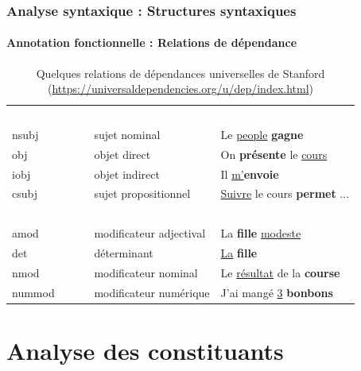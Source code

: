 \documentclass[xcolor=table]{beamer}
\begin{document}
\begin{frame}
\frametitle{Analyse syntaxique : Structures syntaxiques}
\framesubtitle{Annotation fonctionnelle : Relations de dépendance}

\begin{table}
	\begin{tabular}{p{}p{}p{}}
		\rowcolor{darkblue}
		\textcolor{white}{Dép. de base} & \textcolor{white}{Description} & \textcolor{white}{Exemple}\\
		nsubj & sujet nominal & Le \underline{people} \textbf{gagne}\\
		obj & objet direct & On \textbf{présente} le \underline{cours}\\
		iobj & objet indirect & Il \underline{m'}\textbf{envoie}\\
		csubj & sujet propositionnel & \underline{Suivre} le cours \textbf{permet} ...\\
		
		\rowcolor{darkblue}
		\textcolor{white}{Dép. des noms} & \textcolor{white}{Description} & \textcolor{white}{Exemple}\\
		amod & modificateur adjectival & La \textbf{fille} \underline{modeste}\\
		det & déterminant & \underline{La} \textbf{fille}\\
		nmod & modificateur nominal & Le \underline{résultat} de la \textbf{course}\\
		nummod & modificateur numérique & J'ai mangé \underline{3} \textbf{bonbons}\\
		
	\end{tabular}
	\caption{Quelques relations de dépendances universelles de Stanford \cite{2014-de-marneffe-al} (\url{https://universaldependencies.org/u/dep/index.html})}
\end{table}

\end{frame}

\section{Analyse des constituants}
\end{document}

